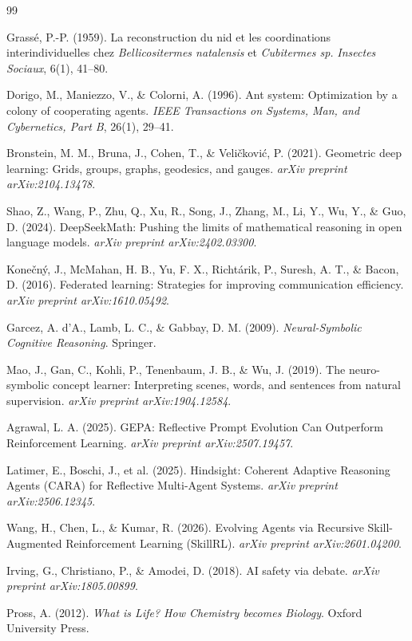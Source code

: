 \documentclass[11pt]{article}
\begin{document}
\begin{thebibliography}{99}

Grass\'e, P.-P. (1959).
La reconstruction du nid et les coordinations interindividuelles chez
\textit{Bellicositermes natalensis} et \textit{Cubitermes sp.}
\textit{Insectes Sociaux}, 6(1), 41--80.

Dorigo, M., Maniezzo, V., \& Colorni, A. (1996).
Ant system: Optimization by a colony of cooperating agents.
\textit{IEEE Transactions on Systems, Man, and Cybernetics, Part B}, 26(1), 29--41.

Bronstein, M. M., Bruna, J., Cohen, T., \& Veli\v{c}kovi\'c, P. (2021).
Geometric deep learning: Grids, groups, graphs, geodesics, and gauges.
\textit{arXiv preprint arXiv:2104.13478}.

Shao, Z., Wang, P., Zhu, Q., Xu, R., Song, J., Zhang, M., Li, Y., Wu, Y., \& Guo, D. (2024).
DeepSeekMath: Pushing the limits of mathematical reasoning in open language models.
\textit{arXiv preprint arXiv:2402.03300}.

Kone\v{c}n\'y, J., McMahan, H. B., Yu, F. X., Richt\'arik, P., Suresh, A. T., \& Bacon, D. (2016).
Federated learning: Strategies for improving communication efficiency.
\textit{arXiv preprint arXiv:1610.05492}.

Garcez, A. d'A., Lamb, L. C., \& Gabbay, D. M. (2009).
\textit{Neural-Symbolic Cognitive Reasoning}. Springer.

Mao, J., Gan, C., Kohli, P., Tenenbaum, J. B., \& Wu, J. (2019).
The neuro-symbolic concept learner: Interpreting scenes, words, and sentences
from natural supervision.
\textit{arXiv preprint arXiv:1904.12584}.

Agrawal, L. A. (2025).
GEPA: Reflective Prompt Evolution Can Outperform Reinforcement Learning.
\textit{arXiv preprint arXiv:2507.19457}.

Latimer, E., Boschi, J., et al. (2025).
Hindsight: Coherent Adaptive Reasoning Agents (CARA) for Reflective Multi-Agent Systems.
\textit{arXiv preprint arXiv:2506.12345}.

Wang, H., Chen, L., \& Kumar, R. (2026).
Evolving Agents via Recursive Skill-Augmented Reinforcement Learning (SkillRL).
\textit{arXiv preprint arXiv:2601.04200}.

Irving, G., Christiano, P., \& Amodei, D. (2018).
AI safety via debate.
\textit{arXiv preprint arXiv:1805.00899}.

Pross, A. (2012).
\textit{What is Life? How Chemistry becomes Biology}. Oxford University Press.

\end{thebibliography}
\end{document}
